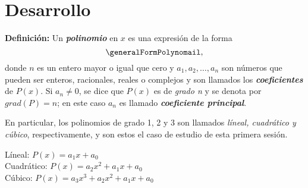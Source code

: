 \section{Desarrollo}

\textbf{Definición:} Un \textbf{\emph{polinomio}} en $x$ es una expresión de la forma \[\generalFormPolynomail,\]
donde $n$ es un entero mayor o igual que cero y $a_1, a_2, \dots, a_n$ son números que pueden ser enteros,
racionales, reales o complejos y son llamados los \textbf{\emph{coeficientes}} de $P(x)$. Si $a_n \neq 0$,
se dice que $P(x)$ es de \emph{grado n} y se denota por $grad(P) = n$; en este caso $a_n$ es llamado \textbf{\emph{coeficiente principal}}.

En particular, los polinomios de grado 1, 2 y 3 son llamados \emph{líneal, cuadrático y cúbico},
respectivamente, y son estos el caso de estudio de esta primera sesión.
\vspace{-2mm}
\begin{center}
    Líneal: $P(x) = a_{1}x+a_0$\\
    Cuadrático: $P(x) = a_2x^2+a_{1}x+a_0$\\
    Cúbico: $P(x) = a_3x^3+a_2x^2+a_{1}x+a_0$
\end{center}

